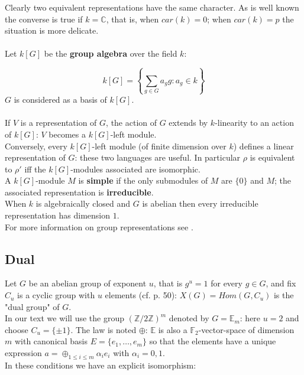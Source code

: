 \documentclass[preprint,12pt,authoryear]{elsarticle}
\theoremstyle{definition}
\begin{document}
\noindent Clearly two equivalent representations have the same character. As is well known the converse is true if  $k= \mathbb{C}$, that is, when $car(k)=0$; when $car(k)=p $ the situation is more delicate.\\\\

Let $k[G]$ be the  {\bf group algebra} over the field $k$:

\[
 k[G]= \left\{\sum_{g\in G} a_{g}g: a_{g}\in k\right\}
\]
$G$ is considered as a basis of $k[G]$.\\\\
If $V$ is a representation of $G$, the action of $G$ extends by $k$-linearity  to an action of $k[G]$: $V$ becomes a $k[G]$-left module.\\
Conversely, every $k[G]$-left module (of finite dimension over $k$)  defines a linear representation of $G$: these two languages are useful. 
In particular $\rho$ is equivalent to $\rho'$ iff the $k[G]$-modules associated are isomorphic.\\

A $k[G]$-module $M$ is {\bf simple} if the only submodules of $M$ are $\{0\}$ and $M$; the associated representation is {\bf irreducible}.\\
When $k$ is algebraically closed and $G$ is abelian then every irreducible representation has dimension $1$. \\
For more information on group representations see \cite{weintraub,serre1,serre2,gorenstein,alperin}.


\subsection{Dual}
Let $G$ be an abelian group of exponent $u$, that is $g^u=1$ for every $g \in G$, and fix 
 $C_u$ is a cyclic group with $u$ elements (cf. \cite{lang} p. 50):  $X(G)=Hom(G,C_u)$ is the "dual group" of $G$.\\

In our text we will use the group $(\mathbb{Z}/2\mathbb{Z})^m$ denoted by $G=\mathbb{E}_m$: here $u=2$ and choose $C_u=\{\pm 1 \}$.  The law  is noted $\oplus$: $\mathbb{E}$ is also a $\mathbb{F}_2$-vector-space of dimension $m$ with canonical basis $E=\{e_1, \ldots , e_m\}$ so that the elements have a unique expression 
${\displaystyle   a= \oplus_{1 \le i \le m} \alpha_i e_i}$ with $\alpha_i= 0, 1$.\\
In these conditions we have an explicit isomorphism:
\end{document}
